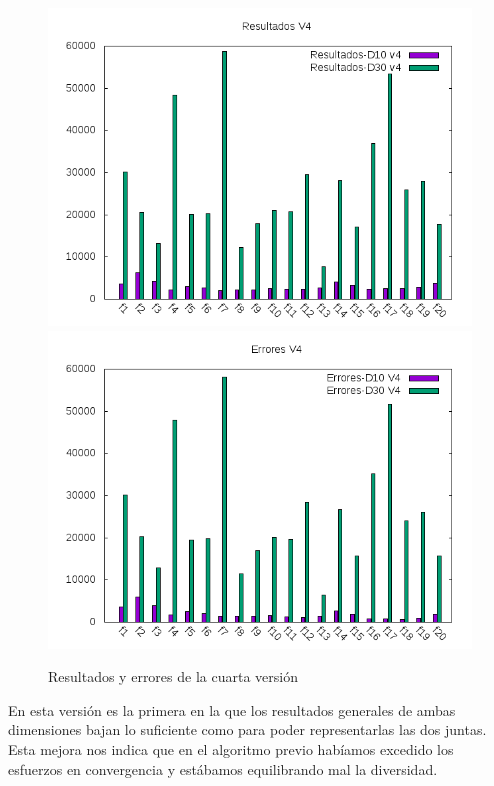 \documentclass[12pt,a4paper]{article}
\begin{document}
	\begin{figure}[!h]
		\includegraphics[scale=0.5]{../Algoritmo/resultados/Imagenes/Resultados/resultados_v4.png}
		\includegraphics[scale=0.5]{../Algoritmo/resultados/Imagenes/Errores/errores_v4.png}
		\caption{Resultados y errores de la cuarta versión}
	\end{figure}

	\newpage

	En esta versión es la primera en la que los resultados generales de ambas dimensiones bajan lo suficiente como para poder representarlas las dos juntas. Esta mejora nos indica que en el algoritmo previo habíamos excedido los esfuerzos en convergencia y estábamos equilibrando mal la diversidad. 
	
\end{document}
